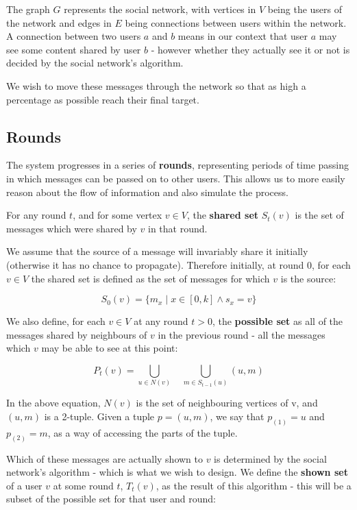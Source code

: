 \documentclass[bsc,frontabs,twoside,singlespacing,parskip,deptreport]{infthesis}     %
\begin{document}
The graph $G$ represents the social network, with vertices in $V$ being the users of the network and edges in $E$ being connections between users within the network. A connection between two users $a$ and $b$ means in our context that user $a$ may see some content shared by user $b$ - however whether they actually see it or not is decided by the social network's algorithm.

We wish to move these messages through the network so that as high a percentage as possible reach their final target.

\subsection{Rounds}
The system progresses in a series of \textbf{rounds}, representing periods of time passing in which messages can be passed on to other users. This allows us to more easily reason about the flow of information and also simulate the process.

For any round $t$, and for some vertex $v \in V$, the \textbf{shared set} $S_{t}(v)$ is the set of messages which were shared by $v$ in that round.

We assume that the source of a message will invariably share it initially (otherwise it has no chance to propagate). Therefore initially, at round 0, for each $v \in V$ the shared set is defined as the set of messages for which $v$ is the source:

\begin{equation}
S_{0}(v) = \{m_{x} \; | \; x \in [0, k] \wedge s_{x} = v\}
\end{equation}


We also define, for each $v \in V$ at any round $t > 0$, the \textbf{possible set} as all of the messages shared by neighbours of $v$ in the previous round - all the messages which $v$ may be able to see at this point:

\begin{equation}
P_{t}(v) = \bigcup_{u \in N(v)} \quad \bigcup_{m \in S_{t-1}(u)} (u, m)
\end{equation}

In the above equation, $N(v)$ is the set of neighbouring vertices of v, and $(u, m)$ is a 2-tuple. Given a tuple $p = (u, m)$, we say that $p_{(1)} = u$ and $p_{(2)} = m$, as a way of accessing the parts of the tuple.

Which of these messages are actually shown to $v$ is determined by the social network's algorithm - which is what we wish to design. We define the \textbf{shown set} of a user $v$ at some round $t$, $T_{t}(v)$, as the result of this algorithm - this will be a subset of the possible set for that user and round:
\end{document}
